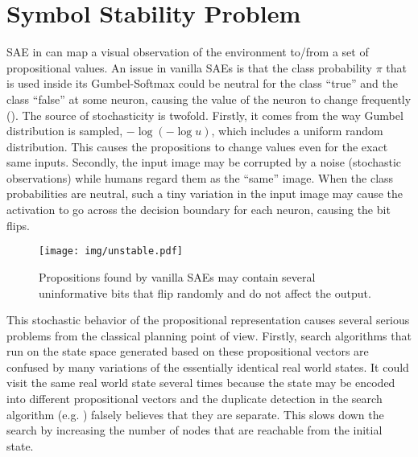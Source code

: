 \section{Symbol Stability Problem}
\label{issues}

SAE in \latentplanner can map a visual observation of the environment to/from a set of propositional values.
An issue in vanilla SAEs is that the class probability $\pi$ that is used inside its Gumbel-Softmax could be
neutral for the class ``true'' and the class ``false'' at some neuron,
causing the value of the neuron to change frequently ().
The source of stochasticity is twofold.
Firstly, it comes from the way Gumbel distribution is sampled, $-\log (-\log u)$,
which includes a uniform random distribution.
This causes the propositions to change values even for the exact same inputs.
Secondly, the input image may be corrupted by a noise (stochastic observations)
while humans regard them as the ``same'' image.
When the class probabilities are neutral,
such a tiny variation in the input image may cause the activation to go across the decision boundary for each neuron,
causing the bit flips.

\begin{figure}[htb]
 \centering
 \texttt{[image: img/unstable.pdf]}
 \caption{Propositions found by vanilla SAEs may contain several uninformative bits
 that flip randomly and do not affect the output.}
 \label{unstable}
\end{figure}

This stochastic behavior of the propositional representation
causes several serious problems from the classical planning point of view.
% 
Firstly, search algorithms that run on the state space generated based on these propositional vectors
are confused by many variations of the essentially identical real world states.
It could visit the same real world state several times because
the state may be encoded into different propositional vectors
and the duplicate detection in the search algorithm (e.g. \astar) falsely believes that they are separate.
This slows down the search by increasing the number of nodes that are reachable from the initial state.

